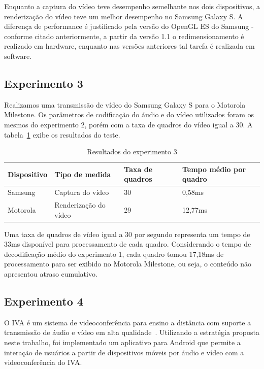 \documentclass{acm_proc_article-sp}
\begin{document}
Enquanto a captura do vídeo teve desempenho semelhante nos dois dispositivos, a renderização do vídeo teve um melhor desempenho no Samsung Galaxy S. A diferença de performance é justificado pela versão do OpenGL ES do Samsung - conforme citado anteriormente, a partir da versão 1.1 o redimensionamento é realizado em hardware, enquanto nas versões anteriores tal tarefa é realizada em software.

\subsection{Experimento 3}
Realizamos uma transmissão de vídeo do Samsung Galaxy S para o Motorola Milestone. Os parâmetros de codificação do áudio e do vídeo utilizados foram os mesmos do experimento 2, porém com a taxa de quadros do vídeo igual a 30. A tabela~\ref{tabela_teste3} exibe os resultados do teste.

\begin{table}[htp]
\centering
\caption{Resultados do experimento 3}
\label{tabela_teste3}
\begin{tabular}{|p{1.5cm}|p{2.5cm}|p{1.2cm}|p{1.2cm}|} \hline
Dispositivo&Tipo de medida&Taxa de quadros&Tempo médio por quadro\\ \hline
Samsung&Captura do vídeo&30&0,58ms\\ \hline
Motorola&Renderização do vídeo&29&12,77ms\\ \hline
\end{tabular}
\end{table}

Uma taxa de quadros de vídeo igual a 30 por segundo representa um tempo de 33ms disponível para processamento de cada quadro. Considerando o tempo de decodificação médio do experimento 1, cada quadro tomou 17,18ms de processamento para ser exibido no Motorola Milestone, ou seja, o conteúdo não apresentou atraso cumulativo.

\subsection{Experimento 4}
O IVA é um sistema de videoconferência para ensino a distância com suporte a transmissão de áudio e vídeo em alta qualidade~\cite{roesler_iva}. Utilizando a estratégia proposta neste trabalho, foi implementado um aplicativo para Android que permite a interação de usuários a partir de dispositivos móveis por áudio e vídeo com a videoconferência do IVA.
\end{document}

